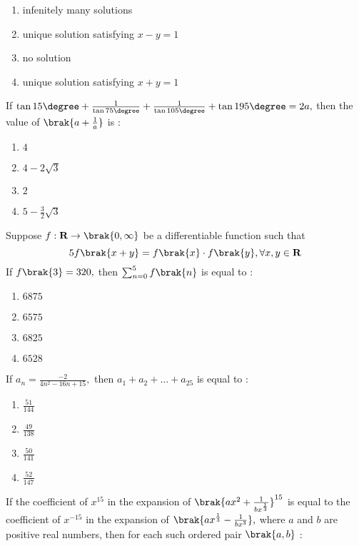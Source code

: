     \begin{enumerate}
        \item infenitely many solutions
        \item unique solution satisfying $x-y=1$
        \item no solution
        \item unique solution satisfying $x+y=1$
    \end{enumerate}
    \item If $\tan 15\degree +\frac{1}{\tan 75\degree}+\frac{1}{\tan 105\degree}+\tan 195\degree =2a,$ then the value of $\brak{a+\frac{1}{a}}$ is $:$
	    \hfill{}\\
    \begin{enumerate}
        \item $4$
        \item $4-2\sqrt{3}$
        \item $2$
        \item $5-\frac{3}{2}\sqrt{3}$
    \end{enumerate}
    \item Suppose $f :\textbf{R} \to \brak{0,\infty}$ be a differentiable function such that $$5f\brak{x+y}=f\brak{x}\cdot f\brak{y},\forall x,y \in \textbf{R}$$ If $f\brak{3}=320,$ then $\sum_{n=0}^5f\brak{n}$ is equal to $:$
	  \hfill{}  \\
    \begin{enumerate}
        \item $6875$
        \item $6575$
        \item $6825$
        \item $6528$
    \end{enumerate}
    \item If $a_n=\frac{-2}{4n^2-16n+15},$ then $a_1+a_2+\dots +a_25$ is equal to $:$
	    \hfill{}\\
    \begin{enumerate}
        \item $\frac{51}{144}$
        \item $\frac{49}{138}$
        \item $\frac{50}{141}$
        \item $\frac{52}{147}$
    \end{enumerate}
    \item If the coefficient of $x^{15}$ in the expansion of $\brak{ax^2+\frac{1}{bx^{\frac{1}{3}}}}^{15}$ is equal to the coefficient of $x^{-15}$ in the expansion of $\brak{ax^{\frac{1}{3}}-\frac{1}{bx^3}},$ where $a$ and $b$ are positive real numbers, then for each such ordered pair $\brak{a,b}$ $:$

